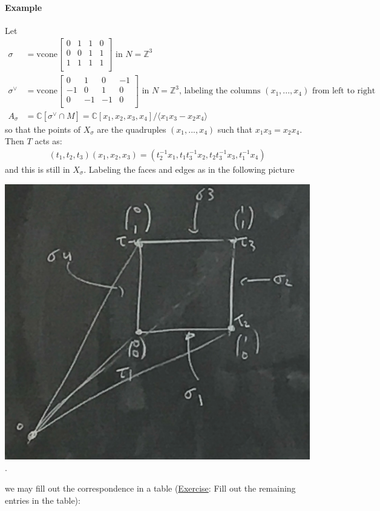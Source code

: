 \documentclass[a4paper,12pt]{amsart}
\newcommand{\ZZ}{\mathbb{Z}}
\newcommand{\CC}{\mathbb{C}}
\begin{document}
\paragraph{Example}
Let
\begin{align*}
\sigma &= \text{vcone} \begin{bmatrix}
0 & 1 & 1 & 0 \\
0 & 0 & 1 & 1 \\
1 & 1 & 1 & 1 \\
\end{bmatrix} \text{ in } N = \ZZ^3 \\
\sigma^\vee &= \text{vcone} \begin{bmatrix}
0 & 1 & 0 & -1 \\
-1 & 0 & 1 & 0 \\
0 & -1 & -1 & 0 \\
\end{bmatrix} \text{ in } N = \ZZ^3 \text{, labeling the columns } (x_1, ..., x_4) \text{ from left to right } \\
A_\sigma &= \CC[\sigma^\vee \cap M] = \CC[x_1, x_2, x_3, x_4] / \langle x_1 x_3 - x_2 x_4 \rangle
\end{align*}
so that the points of $X_\sigma$ are the quadruples $(x_1, ..., x_4)$ such that $x_1 x_3 = x_2 x_4$. Then $T$ acts as:
\begin{align*}
	(t_1, t_2, t_3) (x_1, x_2, x_3) = (t_2^{-1} x_1, t_1 t_3^{-1} x_2, t_2 t_3^{-1} x_3, t_1^{-1} x_4)
\end{align*}
and this is still in $X_\sigma$. Labeling the faces and edges as in the following picture 
\begin{center}
\includegraphics[scale=0.4]{pic/toricvar_feb12_2}.
\end{center}
we may fill out the correspondence in a table (\underline{Exercise}: Fill out the remaining entries in the table):
\end{document}
